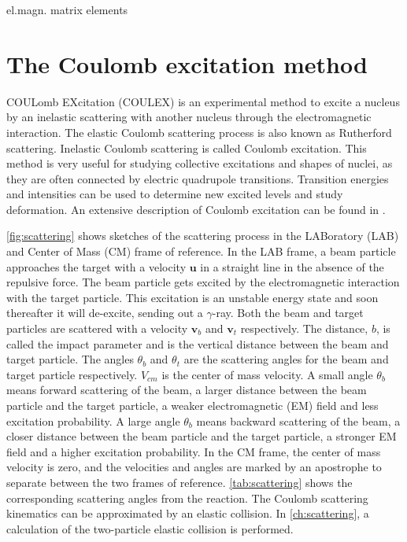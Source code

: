 \documentclass[twoside,english]{uiofysmaster/uiofysmaster}
\newcommand{\ga}{$\gamma$}
\let\orgautoref\autoref
\renewcommand{\autoref}
        {%
		 \def\sectionautorefname{Section}%
		 \def\subsectionautorefname{Section}%
		 \def\subsubsectionautorefname{Section}%
		 \def\chapterautorefname{Chapter}%
          \orgautoref}
\begin{document}
el.magn. matrix elements



\section{The Coulomb excitation method}\label{sec:Coulex}
COULomb EXcitation (COULEX) is an experimental method to excite a nucleus by an inelastic scattering with another nucleus through the electromagnetic interaction. 
The elastic Coulomb scattering process is also known as Rutherford scattering.
Inelastic Coulomb scattering is called Coulomb excitation.
This method is very useful for studying collective excitations and shapes of nuclei, as they are often connected by electric quadrupole transitions.  
Transition energies and intensities can be used to determine new excited levels and study deformation.
An extensive description of Coulomb excitation can be found in \cite{Alder1956, EE-Coulex}.


\autoref{fig:scattering} shows sketches of the scattering process in the LABoratory (LAB) and Center of Mass (CM) frame of reference. 
In the LAB frame, a beam particle approaches the target with a velocity $\mathbf{u}$ in a straight line in the absence of the repulsive force. 
The beam particle gets excited by the electromagnetic interaction with the target particle. 
This excitation is an unstable energy state and soon thereafter it will de-excite, sending out a \ga-ray.
Both the beam and target particles are scattered with a velocity $\mathbf{v}_b$ and $\mathbf{v}_t$ respectively.
The distance, $b$, is called the impact parameter and is the vertical distance between the beam and target particle. 
The angles $\theta_b$ and $\theta_t$ are the scattering angles for the beam and target particle respectively. 
$V_{cm}$ is the center of mass velocity. 
A small angle $\theta_b$ means forward scattering of the beam, a larger distance between the beam particle and the target particle, a weaker electromagnetic (EM) field and less excitation probability. 
A large angle $\theta_b$ means backward scattering of the beam, a closer distance between the beam particle and the target particle, a stronger EM field and a higher excitation probability.
In the CM frame, the center of mass velocity is zero, and the velocities and angles are marked by an apostrophe to separate between the two frames of reference.
\autoref{tab:scattering} shows the corresponding scattering angles from the reaction. 
The Coulomb scattering kinematics can be approximated by an elastic collision.
In \autoref{ch:scattering}, a calculation of the two-particle elastic collision is performed.
\end{document}

